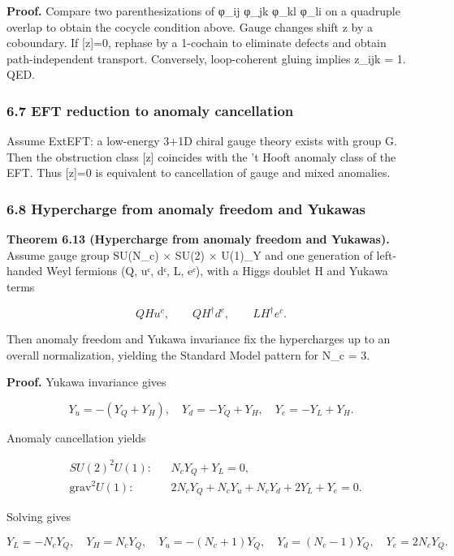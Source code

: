 \documentclass[
]{article}
\begin{document}
\textbf{Proof.} Compare two parenthesizations of φ\_ij φ\_jk φ\_kl φ\_li
on a quadruple overlap to obtain the cocycle condition above. Gauge
changes shift z by a coboundary. If {[}z{]}=0, rephase by a 1-cochain to
eliminate defects and obtain path-independent transport. Conversely,
loop-coherent gluing implies z\_ijk = 1. QED.

\subsubsection{6.7 EFT reduction to anomaly
cancellation}\label{eft-reduction-to-anomaly-cancellation}

Assume ExtEFT: a low-energy 3+1D chiral gauge theory exists with group
G. Then the obstruction class {[}z{]} coincides with the 't Hooft
anomaly class of the EFT. Thus {[}z{]}=0 is equivalent to cancellation
of gauge and mixed anomalies.

\subsubsection{6.8 Hypercharge from anomaly freedom and
Yukawas}\label{hypercharge-from-anomaly-freedom-and-yukawas}

\textbf{Theorem 6.13 (Hypercharge from anomaly freedom and Yukawas).}
Assume gauge group SU(N\_c) × SU(2) × U(1)\_Y and one generation of
left-handed Weyl fermions (Q, uᶜ, dᶜ, L, eᶜ), with a Higgs doublet H and
Yukawa terms

\[
Q H u^c,\qquad Q H^\dagger d^c,\qquad L H^\dagger e^c.
\]

Then anomaly freedom and Yukawa invariance fix the hypercharges up to an
overall normalization, yielding the Standard Model pattern for N\_c = 3.

\textbf{Proof.} Yukawa invariance gives

\[
Y_u = -(Y_Q + Y_H),\quad
Y_d = -Y_Q + Y_H,\quad
Y_e = -Y_L + Y_H.
\]

Anomaly cancellation yields

\[
\begin{aligned}
&SU(2)^2 U(1): && N_c Y_Q + Y_L = 0,\\
&\mathrm{grav}^2 U(1): && 2 N_c Y_Q + N_c Y_u + N_c Y_d + 2 Y_L + Y_e = 0.
\end{aligned}
\]

Solving gives

\[
Y_L = -N_c Y_Q,\quad
Y_H = N_c Y_Q,\quad
Y_u = -(N_c + 1) Y_Q,\quad
Y_d = (N_c - 1) Y_Q,\quad
Y_e = 2 N_c Y_Q.
\]
\end{document}
